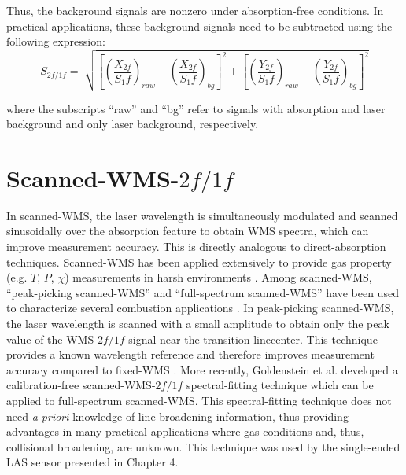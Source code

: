 
\noindent Thus, the background signals are nonzero under absorption-free conditions. In practical applications, these background signals need to be subtracted using the following expression:
\begin{equation}
S_{2f/1f}=\sqrt[]{\left[\left(\frac{X_{2f}}{S_1f}\right)_{raw}-\left(\frac{X_{2f}}{S_1f}\right)_{bg}\right]^2+\left[\left(\frac{Y_{2f}}{S_1f}\right)_{raw}-\left(\frac{Y_{2f}}{S_1f}\right)_{bg}\right]^2}
\end{equation}

\noindent where the subscripts ``raw'' and ``bg'' refer to signals with absorption and laser background and only laser background, respectively.

\section{Scanned-WMS-$2f/1f$}
In scanned-WMS, the laser wavelength is simultaneously modulated and scanned sinusoidally over the absorption feature to obtain WMS spectra, which can improve measurement accuracy. This is directly analogous to direct-absorption techniques. Scanned-WMS has been applied extensively to provide gas property (e.g. $T$, $P$, $\chi$) measurements in harsh environments \cite{Goldenstein2017,Ma2013,Caswell2013,Stritzke2015,Witzel2013,Whitney2011,Makowiecki2017,Rieker2009b,Li2011}. Among scanned-WMS, ``peak-picking scanned-WMS'' and ``full-spectrum scanned-WMS'' have been used to characterize several combustion applications \cite{WOLFRUM19981,HANSON20111,Goldenstein2017,hanson2016spectroscopy,Schulz2007}. In peak-picking scanned-WMS, the laser wavelength is scanned with a small amplitude to obtain only the peak value of the WMS-$2f/1f$ signal near the transition linecenter. This technique provides a known wavelength reference and therefore improves measurement accuracy compared to fixed-WMS \cite{goldenstein20151}. More recently, Goldenstein et al. \cite{Goldenstein2014} developed a calibration-free scanned-WMS-$2f/1f$ spectral-fitting technique which can be applied to full-spectrum scanned-WMS. This spectral-fitting technique does not need \textit{a priori} knowledge of line-broadening information, thus providing advantages in many practical applications where gas conditions and, thus, collisional broadening, are unknown. This technique was used by the single-ended LAS sensor presented in Chapter 4. 

